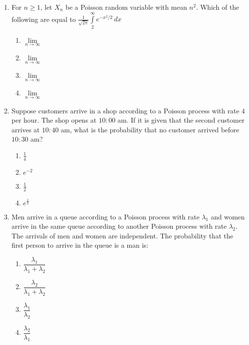 \begin{enumerate}[label=\thesection.\arabic*.,ref=\thesection.\theenumi]
\item For $n \geq 1$, let $X_n$ be a Poisson random  variable with mean $n^2$.
 Which of the following are equal to
 $\displaystyle{\frac{1}{\sqrt{2\pi}} \int \limits_2^{\infty} e^{-x^2/2}\,dx}$
\begin{enumerate}
    \item $\lim \limits_{n \to \infty} $ 
    \item $\lim \limits_{n \to \infty} $ 
    \item $\lim \limits_{n \to \infty} $ 
    \item $\lim \limits_{n \to \infty} $ 
\end{enumerate}
%
\solution

%
%
\solution


%
\item Suppose customers arrive in a shop according to a Poisson process with rate $4$ per hour. The shop opens at $10:00$ am. If it is given that the second customer arrives at $10:40 $ am, what is the probability that no customer arrived before $10:30 $ am? 
%
    \begin{enumerate}
        \item $\frac{1}{4}$
        \item $e^{-2}$
        \item $\frac{1}{2}$
        \item $e^{\frac{1}{2}}$
    \end{enumerate}
%
%
\solution

%
\item Men arrive in a queue according to a Poisson process with rate $\lambda_1$ and women arrive in the same queue according to another Poisson process with rate $\lambda_2$. The arrivals of men and women are independent. The probability that the first person to arrive in the queue is a man is:
\begin{enumerate}
\item $\dfrac{\lambda_1}{\lambda_1+\lambda_2}$
\item $\dfrac{\lambda_2}{\lambda_1+\lambda_2}$
\item $\dfrac{\lambda_1}{\lambda_2}$
\item $\dfrac{\lambda_2}{\lambda_1} $
    
\end{enumerate}
%
\solution


\end{enumerate}